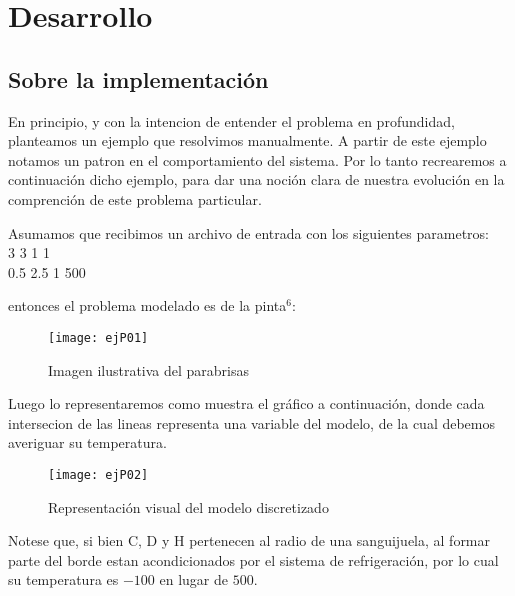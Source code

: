 \section{Desarrollo}

\subsection{Sobre la implementaci\'on}
En principio, y con la intencion de entender el problema en profundidad, planteamos un ejemplo que resolvimos manualmente. A partir de este ejemplo
notamos un patron en el comportamiento del sistema. Por lo tanto recrearemos a continuaci\'on dicho ejemplo, para dar una noci\'on clara de nuestra 
evoluci\'on en la comprenci\'on de este problema particular.

Asumamos que recibimos un archivo de entrada con los siguientes parametros:\\

3 3 1 1\\
0.5 2.5 1 500

entonces el problema modelado es de la pinta$^6$:

\begin{figure}[]
    \texttt{[image: ejP01]}
    \caption{Imagen ilustrativa del parabrisas}
\end{figure}

Luego lo representaremos como muestra el gráfico a continuación, donde cada intersecion de las lineas representa una variable del modelo, de la cual
debemos averiguar su temperatura.

\begin{figure}[]
    \texttt{[image: ejP02]}
    \caption{Representación visual del modelo discretizado}
\end{figure}

Notese que, si bien C, D y H pertenecen al radio de una sanguijuela, al formar parte del borde estan acondicionados por el sistema de refrigeración,
por lo cual su temperatura es $-100$ en lugar de $500$.

